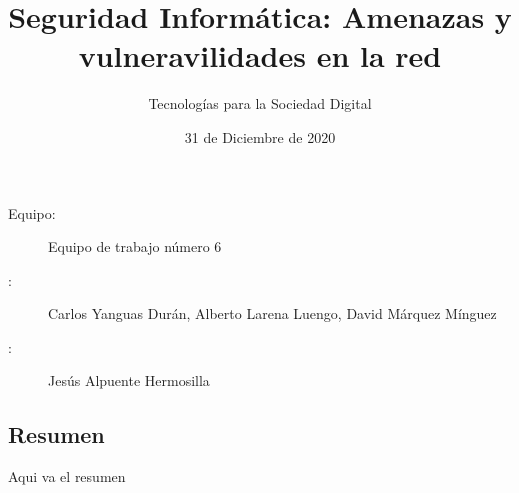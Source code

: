  
  
  

\graphicspath{{../Book/figures/}{../Book/diagrams/}{../Book/photos/}} 

 
\title{Seguridad Informática: Amenazas y vulneravilidades en la red}
\date{31 de Diciembre de 2020}
\author{Tecnologías para la Sociedad Digital}





\maketitle
\begin{description}                                                      
\item[Equipo:] Equipo de trabajo número 6  
\item[\expandafter\makefirstuc\expandafter{\mybookAutorOrAutora}:] Carlos Yanguas Durán, Alberto Larena Luengo, David Márquez Mínguez   
\item[\expandafter\makefirstuc\expandafter{\mybookTutorOrTutores}:] Jesús Alpuente Hermosilla      
\end{description}  


\begin{center}
\section*{Resumen}
\label{cha:resumen}
\end{center}

Aqui va el resumen


                  




\hypersetup{linkcolor=blue}

                        

